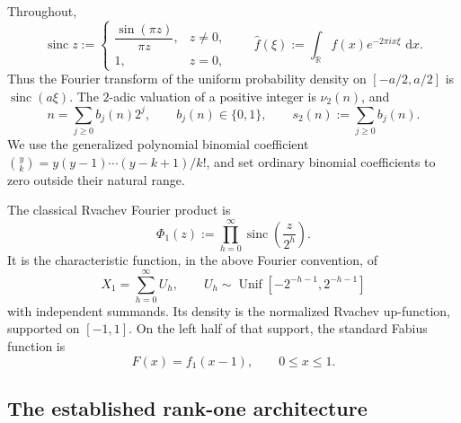 \documentclass[11pt,oneside]{article}
\theoremstyle{definition}
\theoremstyle{remark}
\newcommand{\R}{\mathbb R}
\newcommand{\sinc}{\operatorname{sinc}}
\newcommand{\dd}{\,\mathrm d}
\begin{document}
Throughout,
\[
  \sinc z:=\begin{cases}
  \dfrac{\sin(\pi z)}{\pi z},&z\ne0,\\[0.4em]
  1,&z=0,
  \end{cases}
  \qquad
  \widehat f(\xi):=\int_{\R}f(x)e^{-2\pi i x\xi}\,\dd x.
\]
Thus the Fourier transform of the uniform probability density on $[-a/2,a/2]$ is $\sinc(a\xi)$.  The $2$-adic valuation of a positive integer is $\nu_2(n)$, and
\[
  n=\sum_{j\ge0}b_j(n)2^j,
  \qquad b_j(n)\in\{0,1\},
  \qquad s_2(n):=\sum_{j\ge0}b_j(n).
\]
We use the generalized polynomial binomial coefficient $\binom yk=y(y-1)\cdots(y-k+1)/k!$, and set ordinary binomial coefficients to zero outside their natural range.

The classical Rvachev Fourier product is
\begin{equation}\label{p3:eq:phi1}
  \Phi_1(z):=\prod_{h=0}^{\infty}\sinc\!\left(\frac z{2^h}\right).
\end{equation}
It is the characteristic function, in the above Fourier convention, of
\begin{equation}\label{p3:eq:X1}
  X_1=\sum_{h=0}^{\infty}U_h,
  \qquad U_h\sim\operatorname{Unif}\!\left[-2^{-h-1},2^{-h-1}\right]
\end{equation}
with independent summands.  Its density is the normalized Rvachev up-function, supported on $[-1,1]$.  On the left half of that support, the standard Fabius function is
\begin{equation}\label{p3:eq:fabius-shift}
  F(x)=f_1(x-1),\qquad 0\le x\le1.
\end{equation}

\subsection{The established rank-one architecture}
\end{document}
